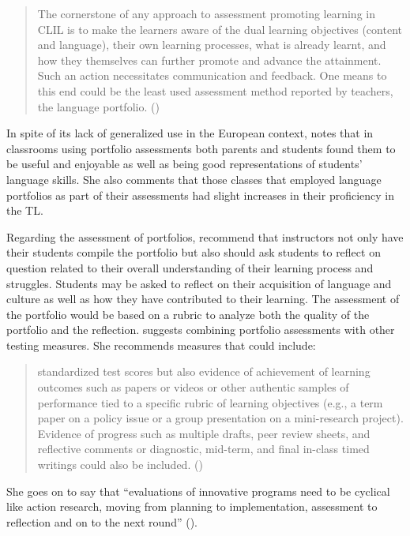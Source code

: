 \documentclass[output=paper]{langscibook}
\begin{document}
\begin{quote}
The cornerstone of any approach to assessment promoting learning in CLIL is to make the learners aware of the dual learning objectives (content and language), their own learning processes, what is already learnt, and how they themselves can further promote and advance the attainment. Such an action necessitates communication and feedback. One means to this end could be the least used assessment method reported by teachers, the language portfolio. (\citeyear[160]{Wewer2020})
\end{quote}

In spite of its lack of generalized use in the European context, \citet{Wewer2020} notes that in classrooms using portfolio assessments both parents and students found them to be useful and enjoyable as well as being good representations of students' language skills. She also comments that those classes that employed language portfolios as part of their assessments had slight increases in their proficiency in the TL.

Regarding the assessment of portfolios, \citet{TedickKlee1998} recommend that instructors not only have their students compile the portfolio but also should ask students to reflect on question related to their overall understanding of their learning process and struggles. Students may be asked to reflect on their acquisition of language and culture as well as how they have contributed to their learning. The assessment of the portfolio would be based on a rubric to analyze both the quality of the portfolio and the reflection. \citet{Kunschak2020} suggests combining portfolio assessments with other testing measures. She recommends measures that could include:
\begin{quote}
standardized test scores but also evidence of achievement of learning outcomes such as papers or videos or other authentic samples of performance tied to a specific rubric of learning objectives (e.g., a term paper on a policy issue or a group presentation on a mini-research project). Evidence of progress such as multiple drafts, peer review sheets, and reflective comments or diagnostic, mid-term, and final in-class timed writings could also be included. (\citeyear[99]{Kunschak2020})
\end{quote}

She goes on to say that “evaluations of innovative programs need to be cyclical like action research, moving from planning to implementation, assessment to reflection and on to the next round” (\citeyear[99]{Kunschak2020}).
\end{document}
